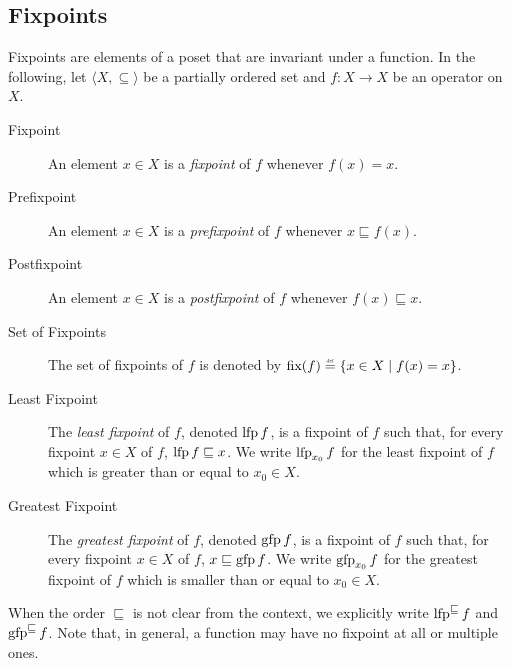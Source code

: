 \subsection{Fixpoints}

Fixpoints are elements of a poset that are invariant under a function.
In the following, let $\langle X, \subseteq \rangle$ be a partially ordered set and $f : X \to X$ be an operator on $X$.

\begin{description}
  \item[Fixpoint] An element $x \in X$ is a \emph{fixpoint} of $f$ whenever $f(x) = x$.
  \item[Prefixpoint] An element $x \in X$ is a \emph{prefixpoint} of $f$ whenever $x \sqsubseteq f(x)$.
  \item[Postfixpoint] An element $x \in X$ is a \emph{postfixpoint} of $f$ whenever $f(x) \sqsubseteq x$.
  \item[Set of Fixpoints] The set of fixpoints of $f$ is denoted by $\fixpoints(f) \defeq \setdef{x \in X}{f(x) = x}$.
  \item[Least Fixpoint] The \emph{least fixpoint} of $f$, denoted $\operatorname{lfp} f$, is a fixpoint of $f$ such that, for every fixpoint $x \in X$ of $f$, $\operatorname{lfp} f \sqsubseteq x$. We write $\operatorname{lfp}_{x_0} f$ for the least fixpoint of $f$ which is greater than or equal to $x_0 \in X$.
  \item[Greatest Fixpoint] The \emph{greatest fixpoint} of $f$, denoted $\operatorname{gfp} f$, is a fixpoint of $f$ such that, for every fixpoint $x \in X$ of $f$, $x \sqsubseteq \operatorname{gfp} f$. We write $\operatorname{gfp}_{x_0} f$ for the greatest fixpoint of $f$ which is smaller than or equal to $x_0 \in X$.
\end{description}

When the order $\sqsubseteq$ is not clear from the context, we explicitly write $\operatorname{lfp}^{\sqsubseteq} f$ and $\operatorname{gfp}^{\sqsubseteq} f$. Note that, in general, a function may have no fixpoint at all or multiple ones.

